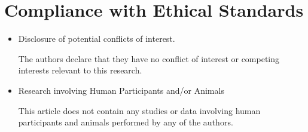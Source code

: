 \documentclass[sn-basic]{sn-jnl}%
\theoremstyle{thmstyleone}%
\theoremstyle{thmstyletwo}%
\theoremstyle{thmstylethree}%
\numberwithin{equation}{theorem}
\begin{document}
\section{Compliance with Ethical Standards}
\begin{itemize}
    \item Disclosure of potential conflicts of interest.
    
    The authors declare that they have no conflict of interest or competing interests relevant to this research.
\item Research involving Human Participants and/or Animals

This article does not contain any studies or data involving human participants and animals performed by any of the authors.


    
\end{itemize}











\end{document}
